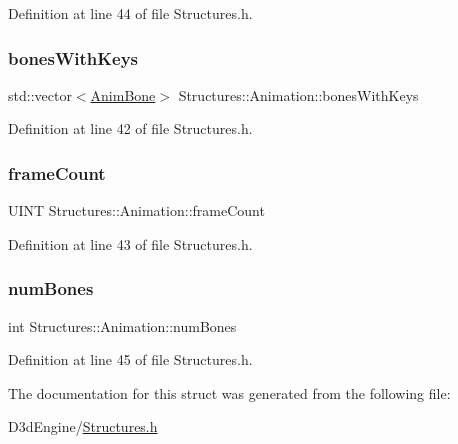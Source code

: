Definition at line 44 of file Structures.\+h.

\mbox{\label{struct_structures_1_1_animation_a6726c126620084018287d0f9211db2b8}} 
\subsubsection{\texorpdfstring{bones\+With\+Keys}{bonesWithKeys}}
{\footnotesize\ttfamily std\+::vector$<$\mbox{\hyperlink{struct_structures_1_1_anim_bone}{Anim\+Bone}}$>$ Structures\+::\+Animation\+::bones\+With\+Keys}



Definition at line 42 of file Structures.\+h.

\mbox{\label{struct_structures_1_1_animation_a6701a71d078aa9490e0f657e60d01735}} 
\subsubsection{\texorpdfstring{frame\+Count}{frameCount}}
{\footnotesize\ttfamily U\+I\+NT Structures\+::\+Animation\+::frame\+Count}



Definition at line 43 of file Structures.\+h.

\mbox{\label{struct_structures_1_1_animation_af5ffea13b6ba8d935ee36e0fb2879587}} 
\subsubsection{\texorpdfstring{num\+Bones}{numBones}}
{\footnotesize\ttfamily int Structures\+::\+Animation\+::num\+Bones}



Definition at line 45 of file Structures.\+h.



The documentation for this struct was generated from the following file\+:\begin{DoxyCompactItemize}
\item 
D3d\+Engine/\mbox{\hyperlink{_structures_8h}{Structures.\+h}}\end{DoxyCompactItemize}
